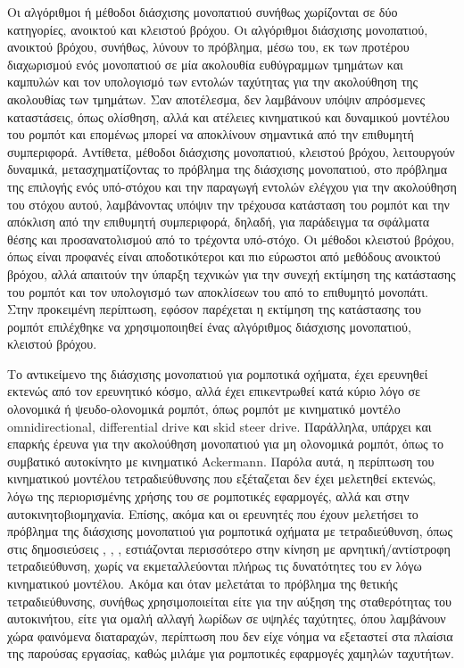 \bigskip
Οι αλγόριθμοι ή μέθοδοι διάσχισης μονοπατιού συνήθως χωρίζονται σε δύο κατηγορίες, ανοικτού και κλειστού βρόχου. Οι αλγόριθμοι διάσχισης μονοπατιού, ανοικτού βρόχου, συνήθως, λύνουν το πρόβλημα, μέσω του, εκ των προτέρου διαχωρισμού ενός μονοπατιού σε μία ακολουθία ευθύγραμμων τμημάτων και καμπυλών και τον υπολογισμό των εντολών ταχύτητας για την ακολούθηση της ακολουθίας των τμημάτων. Σαν αποτέλεσμα, δεν λαμβάνουν υπόψιν απρόσμενες καταστάσεις, όπως ολίσθηση, αλλά και ατέλειες κινηματικού και δυναμικού μοντέλου του ρομπότ και επομένως μπορεί να αποκλίνουν σημαντικά από την επιθυμητή συμπεριφορά. Αντίθετα, μέθοδοι διάσχισης μονοπατιού, κλειστού βρόχου, λειτουργούν δυναμικά, μετασχηματίζοντας το πρόβλημα της διάσχισης μονοπατιού, στο πρόβλημα της επιλογής ενός υπό-στόχου και την παραγωγή εντολών ελέγχου για την ακολούθηση του στόχου αυτού, λαμβάνοντας υπόψιν την τρέχουσα κατάσταση του ρομπότ και την απόκλιση από την επιθυμητή συμπεριφορά, δηλαδή, για παράδειγμα τα σφάλματα θέσης και προσανατολισμού από το τρέχοντα υπό-στόχο. Οι μέθοδοι κλειστού βρόχου, όπως είναι προφανές είναι αποδοτικότεροι και πιο εύρωστοι από μεθόδους ανοικτού βρόχου, αλλά απαιτούν την ύπαρξη τεχνικών για την συνεχή εκτίμηση της κατάστασης του ρομπότ και τον υπολογισμό των αποκλίσεων του από το επιθυμητό μονοπάτι. Στην προκειμένη περίπτωση, εφόσον παρέχεται η εκτίμηση της κατάστασης του ρομπότ επιλέχθηκε να χρησιμοποιηθεί ένας αλγόριθμος διάσχισης μονοπατιού, κλειστού βρόχου.

\bigskip
Το αντικείμενο της διάσχισης μονοπατιού για ρομποτικά οχήματα, έχει ερευνηθεί εκτενώς από τον ερευνητικό κόσμο, αλλά έχει επικεντρωθεί κατά κύριο λόγο σε ολονομικά ή ψευδο-ολονομικά ρομπότ, όπως ρομπότ με κινηματικό μοντέλο omnidirectional, differential drive και skid steer drive. Παράλληλα, υπάρχει και επαρκής έρευνα για την ακολούθηση μονοπατιού για μη ολονομικά ρομπότ, όπως το συμβατικό αυτοκίνητο με κινηματικό Ackermann. Παρόλα αυτά, η περίπτωση του κινηματικού μοντέλου τετραδιεύθυνσης που εξέταζεται δεν έχει μελετηθεί εκτενώς, λόγω της περιορισμένης χρήσης του σε ρομποτικές εφαρμογές, αλλά και στην αυτοκινητοβιομηχανία. Επίσης, ακόμα και οι ερευνητές που έχουν μελετήσει το πρόβλημα της διάσχισης μονοπατιού για ρομποτικά οχήματα με τετραδιεύθυνση, όπως στις δημοσιεύσεις \cite{sm_ptc}, \cite{hybrid_ptc}, \cite{fuzzy_ptc_counter_steering}, εστιάζονται περισσότερο στην κίνηση με αρνητική/αντίστροφη τετραδιεύθυνση, χωρίς να εκμεταλλεύονται πλήρως τις δυνατότητες του εν λόγω κινηματικού μοντέλου. Ακόμα και όταν μελετάται το πρόβλημα της θετικής τετραδιεύθυνσης, συνήθως χρησιμοποιείται είτε για την αύξηση της σταθερότητας του αυτοκινήτου, είτε για ομαλή αλλαγή λωρίδων σε υψηλές ταχύτητες, όπου λαμβάνουν χώρα φαινόμενα διαταραχών, περίπτωση που δεν είχε νόημα να εξεταστεί στα πλαίσια της παρούσας εργασίας, καθώς μιλάμε για ρομποτικές εφαρμογές χαμηλών ταχυτήτων.

